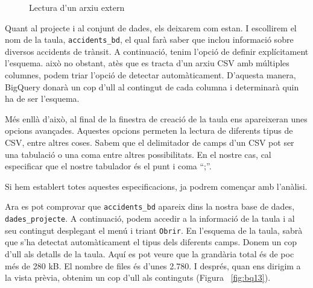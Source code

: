 \documentclass[11pt,longbibliography]{article}
\theoremstyle{definition}
\theoremstyle{remark}
\begin{document}
\begin{figure}[h!]
\par
{}%
\hfill
{}%
\par

\caption{Lectura d'un arxiu extern}
\label{fig:bq12}
\end{figure}


Quant al projecte i al conjunt de dades, els deixarem com estan. I escollirem el nom de la taula, \verb|accidents_bd|, el qual farà saber que inclou informació sobre diversos accidents de trànsit. A continuació, tenim l'opció de definir explícitament l'esquema. això no obstant, atès que es tracta d'un arxiu CSV amb múltiples columnes, podem triar l'opció de detectar automàticament. D'aquesta manera, BigQuery donarà un cop d'ull al contingut de cada columna i determinarà quin ha de ser l'esquema. 



Més enllà d'això, al final de la finestra de creació de la taula ens apareixeran unes opcions avançades. Aquestes opcions permeten la lectura de diferents tipus de CSV, entre altres coses. Sabem que el delimitador de camps d’un CSV pot ser una tabulació o una coma entre altres possibilitats. En el nostre cas, cal especificar que el nostre tabulador és el punt i coma “;”. 



Si hem establert totes aquestes especificacions, ja podrem començar amb l’anàlisi.



Ara es pot comprovar que \verb|accidents_bd| apareix dins la nostra base de dades, \verb|dades_projecte|. A continuació, podem accedir a la informació de la taula i al seu contingut desplegant el menú i triant \texttt{Obrir}. En l'esquema de la taula, sabrà que s'ha detectat automàticament el tipus dels diferents camps. Donem un cop d'ull als detalls de la taula. Aquí es pot veure que la grandària total és de poc més de 280 kB. El nombre de files és d'unes 2.780. I després, quan ens dirigim a la vista prèvia, obtenim un cop d'ull als continguts (Figura ~\ref{fig:bq13}). 
\end{document}
